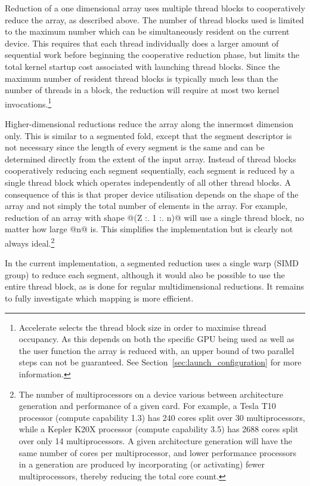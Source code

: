 Reduction of a one dimensional array uses multiple thread blocks to cooperatively reduce the array, as described above. The number of
thread blocks used is limited to the maximum number which can be simultaneously
resident on the current device. This requires that each thread individually does
a larger amount of sequential work before beginning the cooperative reduction
phase, but limits the total kernel startup cost associated with launching thread
blocks. Since the maximum number of resident thread blocks is typically much
less than the number of threads in a block, the reduction will require at most
two kernel invocations.\footnote{Accelerate selects the thread block size in
order to maximise thread occupancy. As this depends on both the specific GPU
being used as well as the user function the array is reduced with, an upper
bound of two parallel steps can not be guaranteed. See
Section~\ref{sec:launch_configuration} for more information.}

Higher-dimensional reductions reduce the array along the innermost dimension
only. This is similar to a segmented fold, except that the segment descriptor is
not necessary since the length of every segment is the same and can be
determined directly from the extent of the input array. Instead of thread blocks
cooperatively reducing each segment sequentially, each segment is reduced by a
single thread block which operates independently of all other thread blocks. A
consequence of this is that proper device utilisation depends on the shape of
the array and not simply the total number of elements in the array. For example,
reduction of an array with shape @(Z :. 1 :. n)@ will use a single thread block,
no matter how large @n@ is. This simplifies the implementation but is clearly
not always ideal.\footnote{The number of multiprocessors on a device various
between architecture generation and performance of a given card. For example, a
Tesla T10 processor (compute capability 1.3) has 240 cores split over 30
multiprocessors, while a Kepler K20X processor (compute capability 3.5) has 2688
cores split over only 14 multiprocessors. A given architecture generation will
have the same number of cores per multiprocessor, and lower performance
processors in a generation are produced by incorporating (or activating) fewer
multiprocessors, thereby reducing the total core count.}

In the current implementation, a segmented reduction uses a single
warp\cuda[warp]{} (SIMD group) to reduce each segment, although it would also be
possible to use the entire thread block, as is done for regular multidimensional
reductions. It remains to fully investigate which mapping is more efficient.


